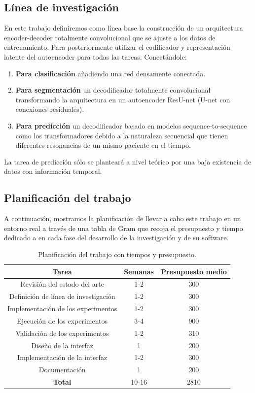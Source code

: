 \subsection{Línea de investigación}

 En este trabajo definiremos como línea base la construcción de un arquitectura encoder-decoder totalmente convolucional que se ajuste a los datos de entrenamiento. Para posteriormente utilizar el codificador y representación latente del autoencoder para todas las tareas. Conectándole:
 
 \begin{enumerate}
 	\item \textbf{Para clasificación} añadiendo una red densamente conectada. 
 	\item \textbf{Para segmentación}  un decodificador totalmente convolucional transformando la arquitectura en un autoencoder ResU-net (U-net con conexiones residuales).
 	\item \textbf{Para predicción} un decodificador basado en modelos sequence-to-sequence como los transformadores debido a la naturaleza secuencial que tienen diferentes resonancias de un mismo paciente en el tiempo.
 	
 \end{enumerate}
 
 La tarea de predicción sólo se planteará a nivel teórico por una baja existencia de datos con información temporal. 
 
\subsection{Planificación del trabajo}

A continuación, mostramos la planificación de llevar a cabo este trabajo en un entorno real a través de una tabla de Gram que recoja el presupuesto y tiempo dedicado a en cada fase del desarrollo de la investigación y de su software.

\begin{table}[H]
	\centering
	\begin{tabular}{|ccc|}
		\toprule
		\textbf{Tarea} & \textbf{Semanas} & \textbf{Presupuesto medio} \\
		\midrule
		Revisión del estado del arte & 1-2 & 300 \\
		Definición de línea de investigación & 1-2 & 300 \\
		Implementación de los experimentos & 1-2 & 300 \\
		Ejecución de los experimentos & 3-4 & 900 \\
		Validación de los experimentos & 1-2 & 310 \\
		Diseño de la interfaz & 1 & 200 \\
		Implementación de la interfaz & 1-2 & 300\\
		Documentación & 1 &  200 \\
		\hline
		\textbf{Total} & 10-16 &  2810 \\
		\bottomrule
	\end{tabular}
	\caption{Planificación del trabajo con tiempos y presupuesto.}
	\label{tabla:planificacion}
\end{table}

